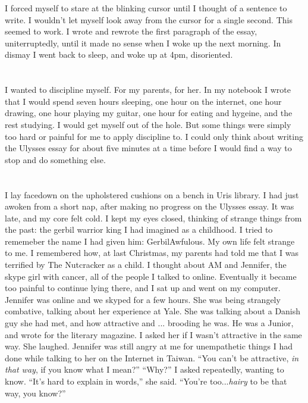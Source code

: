 I forced myself to stare at the blinking cursor until I thought of a sentence to
write.  I wouldn't let myself look away from the cursor for a single second.
This seemed to work.  I wrote and rewrote the first paragraph of the essay,
uniterruptedly, until it made no sense when I woke up the next morning.  In
dismay I went back to sleep, and woke up at 4pm, disoriented.  

\section{}

I wanted to discipline myself.  For my parents, for her.  In my notebook I wrote
that I would spend seven hours sleeping, one hour on the internet, one hour
drawing, one hour playing my guitar, one hour for eating and hygeine, and the
rest studying.  I would get myself out of the hole.  But some things were simply
too hard or painful for me to apply discipline to.  I could only think about
writing the Ulysses essay for about five minutes at a time before I would find a
way to stop and do something else.

\section{}

I lay facedown on the upholstered cushions on a bench in Uris library.  I had
just awoken from a short nap, after making no progress on the Ulysses essay.  It
was late, and my core felt cold.  I kept my eyes closed, thinking of strange
things from the past: the gerbil warrior king I had imagined as a childhood.  I
tried to rememeber the name I had given him: GerbilAwfulous.  My own life felt
strange to me.  I remembered how, at last Christmas, my parents had told me that
I was terrified by The Nutcracker as a child.  I thought about AM and Jennifer,
the skype girl with cancer, all of the people I talked to online.  Eventually it
became too painful to continue lying there, and I sat up and went on my
computer.  Jennifer was online and we skyped for a few hours.  She was being
strangely combative, talking about her experience at Yale.  She was talking
about a Danish guy she had met, and how attractive and ... brooding he was.  He
was a Junior, and wrote for the literary magazine.  I asked her if I wasn't
attractive in the same way.  She laughed.  Jennifer was still angry at me for
unempathetic things I had done while talking to her on the Internet in Taiwan.
``You can't be attractive, \textit{in that way}, if you know what I mean?''
``Why?'' I asked repeatedly, wanting to know. ``It's hard to explain in words,''
she said.  ``You're too...\textit{hairy} to be that way, you know?''

